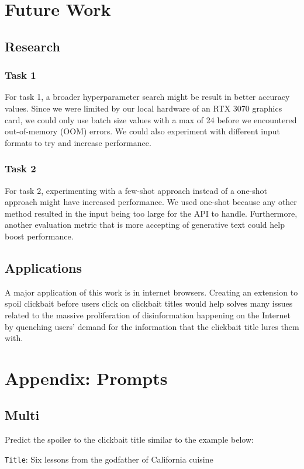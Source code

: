 \documentclass[12pt]{article}
\begin{document}
\section{Future Work}
\subsection{Research}
\subsubsection{Task 1}
For task 1, a broader hyperparameter search might be result in better accuracy values. Since we were limited by our local hardware of an RTX 3070 graphics card, we could only use batch size values with a max of 24 before we encountered out-of-memory (OOM) errors. We could also experiment with different input formats to try and increase performance.
\subsubsection{Task 2}
For task 2, experimenting with a few-shot approach instead of a one-shot approach might have increased performance. We used one-shot because any other method resulted in the input being too large for the API to handle. Furthermore, another evaluation metric that is more accepting of generative text could help boost performance.
\subsection{Applications}
A major application of this work is in internet browsers. Creating an extension to spoil clickbait before users click on clickbait titles would help solves many issues related to the massive proliferation of disinformation happening on the Internet by quenching users' demand for the information that the clickbait title lures them with.

\nocite{*}


\appendix
\section{Appendix: Prompts}
\label{prompts}
\subsection{Multi}
Predict the spoiler to the clickbait title similar to the example below:

\verb|Title|: Six lessons from the godfather of California cuisine \\
\end{document}
